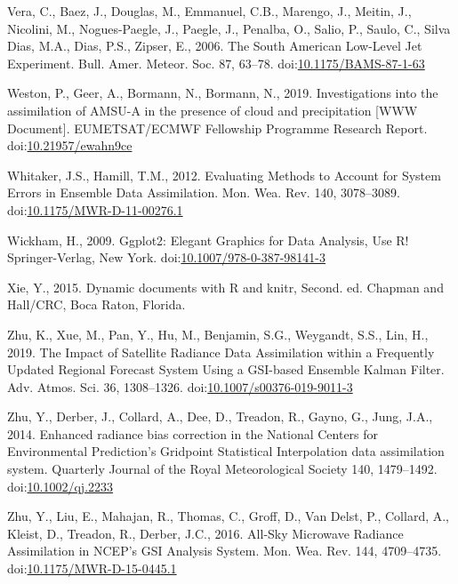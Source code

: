 \documentclass[final,5p,times,twocolumn,authoryear]{elsarticle} %
\begin{document}
\leavevmode\hypertarget{ref-vera2006}{}%
Vera, C., Baez, J., Douglas, M., Emmanuel, C.B., Marengo, J., Meitin, J., Nicolini, M., Nogues-Paegle, J., Paegle, J., Penalba, O., Salio, P., Saulo, C., Silva Dias, M.A., Dias, P.S., Zipser, E., 2006. The South American Low-Level Jet Experiment. Bull. Amer. Meteor. Soc. 87, 63--78. doi:\href{https://doi.org/10.1175/BAMS-87-1-63}{10.1175/BAMS-87-1-63}

\leavevmode\hypertarget{ref-weston2019}{}%
Weston, P., Geer, A., Bormann, N., Bormann, N., 2019. Investigations into the assimilation of AMSU-A in the presence of cloud and precipitation {[}WWW Document{]}. EUMETSAT/ECMWF Fellowship Programme Research Report. doi:\href{https://doi.org/10.21957/ewahn9ce}{10.21957/ewahn9ce}

\leavevmode\hypertarget{ref-whitaker2012}{}%
Whitaker, J.S., Hamill, T.M., 2012. Evaluating Methods to Account for System Errors in Ensemble Data Assimilation. Mon. Wea. Rev. 140, 3078--3089. doi:\href{https://doi.org/10.1175/MWR-D-11-00276.1}{10.1175/MWR-D-11-00276.1}

\leavevmode\hypertarget{ref-wickham2009}{}%
Wickham, H., 2009. Ggplot2: Elegant Graphics for Data Analysis, Use R! Springer-Verlag, New York. doi:\href{https://doi.org/10.1007/978-0-387-98141-3}{10.1007/978-0-387-98141-3}

\leavevmode\hypertarget{ref-xie2015}{}%
Xie, Y., 2015. Dynamic documents with R and knitr, Second. ed. Chapman and Hall/CRC, Boca Raton, Florida.

\leavevmode\hypertarget{ref-zhu2019}{}%
Zhu, K., Xue, M., Pan, Y., Hu, M., Benjamin, S.G., Weygandt, S.S., Lin, H., 2019. The Impact of Satellite Radiance Data Assimilation within a Frequently Updated Regional Forecast System Using a GSI-based Ensemble Kalman Filter. Adv. Atmos. Sci. 36, 1308--1326. doi:\href{https://doi.org/10.1007/s00376-019-9011-3}{10.1007/s00376-019-9011-3}

\leavevmode\hypertarget{ref-zhu2014}{}%
Zhu, Y., Derber, J., Collard, A., Dee, D., Treadon, R., Gayno, G., Jung, J.A., 2014. Enhanced radiance bias correction in the National Centers for Environmental Prediction's Gridpoint Statistical Interpolation data assimilation system. Quarterly Journal of the Royal Meteorological Society 140, 1479--1492. doi:\href{https://doi.org/10.1002/qj.2233}{10.1002/qj.2233}

\leavevmode\hypertarget{ref-zhu2016}{}%
Zhu, Y., Liu, E., Mahajan, R., Thomas, C., Groff, D., Van Delst, P., Collard, A., Kleist, D., Treadon, R., Derber, J.C., 2016. All-Sky Microwave Radiance Assimilation in NCEP's GSI Analysis System. Mon. Wea. Rev. 144, 4709--4735. doi:\href{https://doi.org/10.1175/MWR-D-15-0445.1}{10.1175/MWR-D-15-0445.1}
\end{document}
